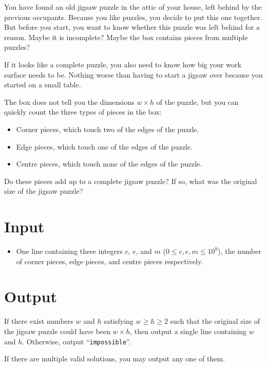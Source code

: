 

You have found an old jigsaw puzzle in the attic of your house, left behind by
the previous occupants. Because you like puzzles, you decide to put this one
together. But before you start, you want to know whether this puzzle was left
behind for a reason. Maybe it is incomplete? Maybe the box contains pieces from
multiple puzzles? 

If it looks like a complete puzzle, you also need to know how big your work
surface needs to be. Nothing worse than having to start a jigsaw over because
you started on a small table.

The box does not tell you the dimensions $w \times h$ of the puzzle, but you can
quickly count the three types of pieces in the box:
\begin{itemize}
	\item
		Corner pieces, which touch two of the edges of the puzzle.
	\item
		Edge pieces, which touch one of the edges of the puzzle.
	\item
		Centre pieces, which touch none of the edges of the puzzle.
\end{itemize}

Do these pieces add up to a complete jigsaw puzzle? If so, what was the original
size of the jigsaw puzzle?


\section*{Input}
	\begin{itemize}
		\item
			One line containing three integers $c$, $e$, and $m$
			($0\leq c,e,m\leq10^9$), the number of corner pieces,
			edge pieces, and centre pieces respectively.
	\end{itemize}

\section*{Output}
	If there exist numbers $w$ and $h$ satisfying $w\geq h\geq 2$ such that the original size of
	the jigsaw puzzle could have been $w\times h$, then output a single
	line containing $w$ and $h$.
	Otherwise, output ``\texttt{impossible}''.

	If there are multiple valid solutions, you may output any one of them.
